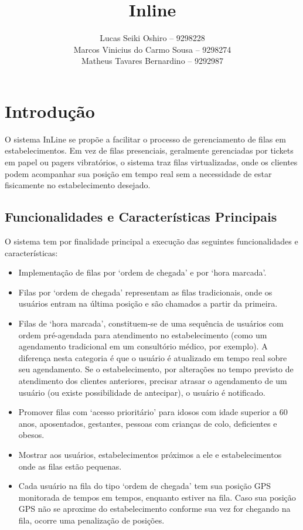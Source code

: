 \documentclass{book}
\title{Inline}
\author{Lucas Seiki Oshiro -- 9298228\\
  Marcos Vinicius do Carmo Sousa -- 9298274\\
  Matheus Tavares Bernardino -- 9292987\\}
\begin{document}
\maketitle
\tableofcontents

\chapter{Introdução}
O sistema InLine se propõe a facilitar o processo de gerenciamento de filas em
estabelecimentos. Em vez de filas presenciais, geralmente gerenciadas por
tickets em papel ou pagers vibratórios, o sistema traz filas virtualizadas, onde
os clientes podem acompanhar sua posição em tempo real sem a necessidade de
estar fisicamente no estabelecimento desejado.

\section{Funcionalidades e Características Principais}
O sistema tem por finalidade principal a execução das seguintes funcionalidades
e características:

\begin{itemize}
\item Implementação de filas por ‘ordem de chegada’ e por ‘hora marcada’.
\item Filas por ‘ordem de chegada’ representam as filas tradicionais, onde os
  usuários entram na última posição e são chamados a partir da primeira. 
\item Filas de ‘hora marcada’, constituem-se de uma sequência de usuários com
  ordem pré-agendada para atendimento no estabelecimento (como um agendamento
  tradicional em um consultório médico, por exemplo). A diferença nesta
  categoria é que o usuário é atualizado em tempo real sobre seu agendamento. Se
  o estabelecimento, por alterações no tempo previsto de atendimento dos
  clientes anteriores, precisar atrasar o agendamento de um usuário (ou existe
  possibilidade de antecipar), o usuário é notificado.
\item Promover filas com ‘acesso prioritário’ para idosos com idade superior a
  60 anos, aposentados, gestantes, pessoas com crianças de colo, deficientes e
  obesos.
\item Mostrar aos usuários, estabelecimentos próximos a ele e estabelecimentos
  onde as filas estão pequenas.
\item Cada usuário na fila do tipo ‘ordem de chegada’ tem sua posição GPS
  monitorada de tempos em tempos, enquanto estiver na fila. Caso sua posição GPS
  não se aproxime do estabelecimento conforme sua vez for chegando na fila,
  ocorre uma penalização de posições.
\end{itemize}
\end{document}
